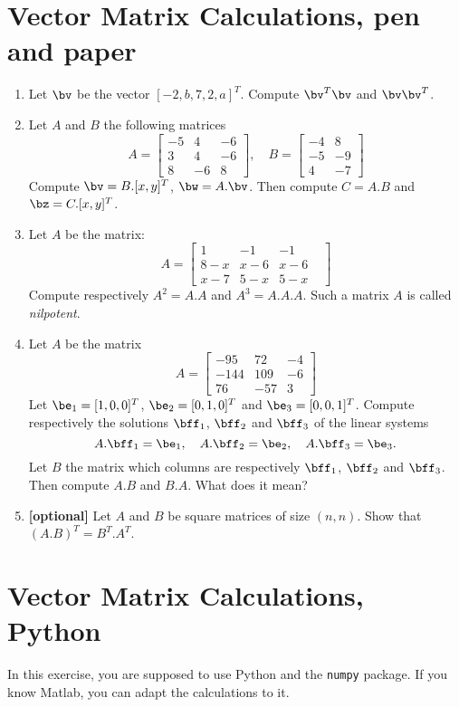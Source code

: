 \documentclass[a4paper,10pt]{article}
\begin{document}
\section{Vector Matrix Calculations, pen and paper}
\begin{enumerate}
  \item Let $\bv$ be the vector $[-2,b,7,2,a]^T$. Compute $\bv^T\bv$ and $\bv\bv^T$.
  \item Let $A$ and $B$ the following matrices
  $$
  A = \begin{bmatrix}
    -5 & 4 & -6\\
    3 & 4 & -6\\
    8 & -6 & 8
  \end{bmatrix},
  \quad
  B = \begin{bmatrix}
    -4 & 8\\ -5 & -9\\ 4 & -7
  \end{bmatrix}
  $$
  Compute $\bv = B.[x,y]^T$, $\bw = A.\bv$. Then compute $C = A.B$ and $\bz = C.[x,y]^T$.
  \item Let $A$ be the matrix:
  $$
  A = \begin{bmatrix}
  1&  -1&  -1\\
  8-x&  x-6&  x-6&\\
   x-7&   5-x&   5-x&
   \end{bmatrix}
  $$
  Compute respectively $A^2 = A.A$ and $A^3 = A.A.A$. Such a matrix $A$ is called \emph{nilpotent}.
  \item Let $A$ be the matrix
  $$
  A = \begin{bmatrix}
    -95 & 72 & -4\\
    -144 & 109 & -6\\
    76 & -57 & 3 
  \end{bmatrix}
  $$
  Let $\be_1 = [1,0,0]^T$, $\be_2 = [0,1,0]^T$ and $\be_3=[0,0,1]^T$.
  Compute respectively the solutions $\bff_1$, $\bff_2$ and $\bff_3$ of the linear systems 
  $$
  A.\bff_1 = \be_1,\quad A.\bff_2 = \be_2,\quad A.\bff_3 = \be_3.
  $$
  Let $B$ the matrix which columns are respectively $\bff_1$, $\bff_2$ and $\bff_3$. Then compute $A.B$ and $B.A$. What does it mean?
  \item {\bf[optional]} Let $A$ and $B$ be square matrices of size $(n,n)$. Show that $(A.B)^T = B^T.A^T$.
\end{enumerate}


\section{Vector Matrix Calculations, Python}
In this exercise, you are supposed to use Python and the \texttt{numpy} package. If you know Matlab, you can adapt the calculations to it.
\end{document}
